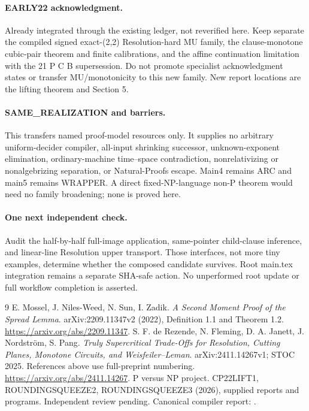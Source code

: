\documentclass[11pt]{article}
\begin{document}
\paragraph{EARLY22 acknowledgment.}
Already integrated through the existing ledger, not reverified here. Keep
separate the compiled signed exact-(2,2) Resolution-hard MU family, the
clause-monotone cubic-pair theorem and finite calibrations, and the affine
continuation limitation with the 21 P C B supersession. Do not promote
specialist acknowledgment states or transfer MU/monotonicity to this new
family. New report locations are the lifting theorem and Section 5.

\paragraph{SAME\_REALIZATION and barriers.}
This transfers named proof-model resources only. It supplies no arbitrary
uniform-decider compiler, all-input shrinking successor, unknown-exponent
elimination, ordinary-machine time--space contradiction, nonrelativizing or
nonalgebrizing separation, or Natural-Proofs escape. Main4 remains ARC and
main5 remains WRAPPER. A direct fixed-NP-language non-P theorem would need
no family broadening; none is proved here.

\paragraph{One next independent check.}
Audit the half-by-half full-image application, same-pointer child-clause
inference, and linear-line Resolution upper transport. Those interfaces,
not more tiny examples, determine whether the composed candidate survives.
Root main.tex integration remains a separate SHA-safe action. No unperformed
root update or full workflow completion is asserted.

\begin{thebibliography}{9}
 E. Mossel, J. Niles-Weed, N. Sun, I. Zadik.
\emph{A Second Moment Proof of the Spread Lemma}.
arXiv:2209.11347v2 (2022), Definition 1.1 and Theorem 1.2.
\url{https://arxiv.org/abs/2209.11347}.
 S. F. de Rezende, N. Fleming, D. A. Janett,
J. Nordstr\"om, S. Pang. \emph{Truly Supercritical Trade-Offs for
Resolution, Cutting Planes, Monotone Circuits, and Weisfeiler--Leman}.
arXiv:2411.14267v1; STOC 2025. References above use full-preprint numbering.
\url{https://arxiv.org/abs/2411.14267}.
 P versus NP project. CP22LIFT1, ROUNDINGSQUEEZE2,
ROUNDINGSQUEEZE3 (2026), supplied reports and programs. Independent review
pending. Canonical compiler report:
.
\end{thebibliography}
\end{document}
